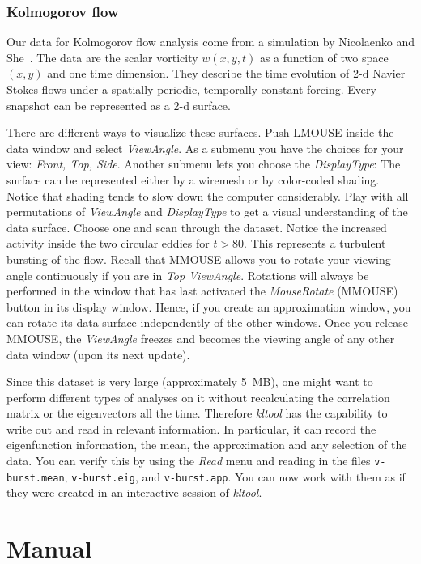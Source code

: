 \subsubsection{Kolmogorov flow}
Our data for Kolmogorov flow analysis come from a simulation by Nicolaenko and
She~\cite{nic8}. The data are the scalar vorticity $w(x,y,t)$ as a function
of two space $(x,y)$ and one time dimension. They describe the time evolution
of 2-d Navier Stokes flows under a spatially periodic, temporally constant
forcing. Every snapshot can be represented as a 2-d surface.

There are different ways to visualize these surfaces.
Push LMOUSE inside the data window and select {\sl ViewAngle}.
As a submenu you have the choices for your view: {\sl Front, Top, Side}.
Another submenu lets you choose the {\sl DisplayType}: The
surface can be represented either by a wiremesh or by color-coded
shading. Notice that shading tends to slow down the computer considerably.
Play with all permutations of {\sl ViewAngle} and {\sl DisplayType} to get
a visual understanding of the data surface. Choose one and scan through 
the dataset. Notice the increased activity inside the two circular
eddies for $t > 80$. This represents a turbulent bursting of the flow.
Recall that MMOUSE allows you to rotate your viewing angle continuously
if you are in {\sl Top ViewAngle}. Rotations will
always be performed in the window that has
last activated the {\sl MouseRotate} (MMOUSE) button in its display window.
Hence, if you create an approximation window,
you can rotate its data surface independently of the other windows.
Once you release MMOUSE, the {\sl ViewAngle} freezes and becomes
the viewing angle of any other data window (upon its next update).

Since this dataset is very large (approximately 5~MB),
one might want to perform different types of analyses on it
without recalculating the correlation matrix or
the eigenvectors all the time.
Therefore {\sl kltool} has the capability to write
out and read in relevant information. In particular, it can record the
eigenfunction information, the mean, the approximation and any selection
of the data. You can verify this by using the {\sl Read} menu and reading
in the files {\tt v-burst.mean}, {\tt v-burst.eig}, and {\tt v-burst.app}.
You can now work with them as if they were created in an 
interactive session of {\sl kltool}.
\newpage
\section{Manual}
